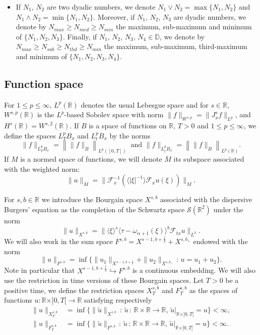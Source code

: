 \documentclass{amsart}
\theoremstyle{definition}
\theoremstyle{remark}
\def\R{{\mathbb R}}
\def\F{\mathcal{F}}
\numberwithin{equation}{section}
\newcommand\cro[1]{\langle #1 \rangle}
\begin{document}
\begin{itemize}
\item 
If $N_1$, $N_2 $ are two dyadic numbers, we denote $N_1 \vee N_2 =\max\{N_1,N_2\}$ and $N_1 \wedge N_2 =\min\{N_1,N_2\}$. Moreover, if $N_1, \, N_2, \, N_3$ are dyadic numbers, we denote by $N_{max} \ge N_{med} \ge N_{min}$ the maximum, sub-maximum and minimum of $\{N_1,N_2,N_3\}$. Finally, if $N_1, \, N_2, \, N_3, \, N_4 \in \mathbb D$, we denote by 
$N_{max} \ge  N_{sub} \ge N_{thd} \ge N_{min}$ the maximum, sub-maximum, third-maximum and minimum of  $\{N_1,N_2,N_3,N_4\}$.
\end{itemize}


\subsection{Function space} \label{FuncSpa}
For $1\le p\le\infty$, $L^p(\R)$ denotes the usual Lebesgue space and for $s\in\R$, $W^{s,p}(\R)$ is the $L^p$-based Sobolev space with norm $\|f\|_{W^{s,p}}=\|J_x^s f\|_{L^p}$, and $H^s(\R)=W^{s,2}(\R)$.
If $B$ is a space of functions on $\R$, $T>0$ and $1\le p\le\infty$, we define the spaces $L^p_TB_x$ and $L^p_tB_x$ by the norms
$$
\|f\|_{L^p_TB_x} = \left\| \|f\|_{B}\right\|_{L^p([0,T])} \ \textrm{ and } \|f\|_{L^p_tB_x} = \left\| \|f\|_B \right\|_{L^p(\R)}.
$$
If $M$ is a normed space of  functions, we will denote $\overline{M}$ its subspace associated with the weighted norm:
$$
\|u\|_{\overline{M}} = \|\F_x^{-1}( \cro{|\xi|^{-1}}\F_xu(\xi))\|_M.
$$


For $s,b\in\R$ we introduce the Bourgain space $X^{s,b}$ associated with the dispersive Burgers' equation as the completion of the Schwartz space $\mathcal{S}(\R^2)$ under the norm
$$
\|u\|_{X^{s,b}} = \|\cro{\xi}^s \cro{\tau-\omega_{\alpha+1}(\xi)}^b \F_{tx}u \|_{L^2}.
$$
We will also work in the sum space $F^{s,b} = X^{s-1,b+\frac12}+X^{s,b_+}$ endowed with the norm
\begin{equation} \label{F}
\|u\|_{F^{s,b}} = \inf \big\{ \|u_1\|_{X^{s-1,b+\frac12}} + \|u_2\|_{X^{s,b_+}} \, : \, u=u_1+u_2\big\}.
\end{equation}
Note in particular that $X^{s-1,b+\frac12} \hookrightarrow F^{s,b}$ is a continuous embedding. 
We will also use the restriction in time versions of these Bourgain spaces. Let $T>0$ be a positive time, we define the restriction spaces $X^{s,b}_T$ and $F^{s,b}_T$ as the spaces of functions $u : \R\times ]0,T[\to\R$ satisfying respectively
\begin{align*}
\|u\|_{X^{s,b}_T} &= \inf \{ \|\widetilde{u}\|_{X^{s,b}} \, : \, \widetilde{u} \, : \, \R\times\R\to\R, \, \widetilde{u}|_{\R\times ]0,T[} = u\} <\infty , \\
\|u\|_{F^{s,b}_T} &= \inf \{ \|\widetilde{u}\|_{F^{s,b}} \, : \, \widetilde{u} \, : \, \R\times\R\to\R, \, \widetilde{u}|_{\R\times ]0,T[} = u\} <\infty .
\end{align*}
\end{document}
